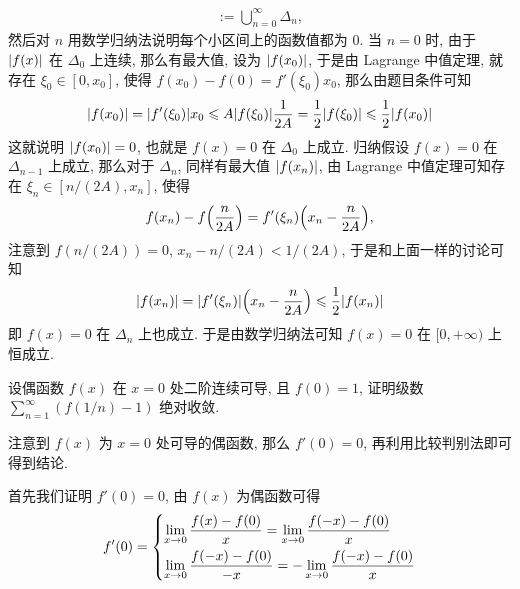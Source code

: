 \begin{exercise}[series=exer]
\begin{answer}
      \begin{align*}
          [0, +\infty) = \bigcup_{n = 0}^{\infty}\qty[\frac{n}{2A}, \frac{n + 1}{2A}] := \bigcup_{n = 0}^{\infty}\Delta_{n},
      \end{align*}
      然后对 $ n $ 用数学归纳法说明每个小区间上的函数值都为 $ 0 $. 当 $ n = 0 $ 时, 由于 $ \abs{f(x)} $ 在 $ \Delta_{0} $ 上连续, 那么有最大值, 设为 $ \abs{f(x_{0})} $, 于是由 Lagrange 中值定理, 就存在 $ \xi_{0} \in [0, x_{0}] $, 使得 $ f(x_{0}) - f(0) = f'(\xi_{0})x_{0} $, 那么由题目条件可知
      \begin{align*}
          \abs{f(x_{0})} = \abs{f'(\xi_{0})}x_{0} \leqslant A\abs{f(\xi_{0})}\frac{1}{2A} = \frac{1}{2}\abs{f(\xi_{0})} \leqslant \frac{1}{2}\abs{f(x_{0})}
      \end{align*}
      这就说明 $ \abs{f(x_{0})} = 0 $, 也就是 $ f(x) = 0 $ 在 $ \Delta_{0} $ 上成立. 归纳假设 $ f(x) = 0 $ 在 $ \Delta_{n - 1} $ 上成立, 那么对于 $ \Delta_{n} $, 同样有最大值 $ \abs{f(x_{n})} $, 由 Lagrange 中值定理可知存在 $ \xi_{n} \in [n/(2A), x_{n}] $, 使得
      \begin{align*}
          f(x_{n}) - f\qty(\frac{n}{2A}) = f'(\xi_{n})\qty(x_{n} - \frac{n}{2A}),
      \end{align*}
      注意到 $ f(n/(2A)) = 0 $, $ x_{n} - n/(2A) < 1/(2A) $, 于是和上面一样的讨论可知
      \begin{align*}
          \abs{f(x_{n})} = \abs{f'(\xi_{n})}\qty(x_{n} - \frac{n}{2A}) \leqslant \frac{1}{2}\abs{f(x_{n})}
      \end{align*}
      即 $ f(x) = 0 $ 在 $ \Delta_{n} $ 上也成立. 于是由数学归纳法可知 $ f(x) = 0 $ 在 $ [0, +\infty) $ 上恒成立.
  \end{answer}
  \item 设偶函数 $ f(x) $ 在 $ x = 0 $ 处二阶连续可导, 且 $ f(0) = 1 $, 证明级数 $ \sum_{n = 1}^{\infty} (f(1/n) - 1) $ 绝对收敛.
  \begin{hint}
      注意到 $ f(x) $ 为 $ x = 0 $ 处可导的偶函数, 那么 $ f'(0) = 0 $, 再利用比较判别法即可得到结论.
  \end{hint}
  \begin{answer}
      首先我们证明 $ f'(0) = 0 $, 由 $ f(x) $ 为偶函数可得
      \begin{align*}
          f'(0) = \begin{dcases}
              \limit{x}{0}\frac{f(x) - f(0)}{x} = \limit{x}{0}\frac{f(-x) - f(0)}{x} \\
              \limit{x}{0} \frac{f(-x) - f(0)}{-x} = -\limit{x}{0}\frac{f(-x) - f(0)}{x}
          \end{dcases}

\end{align*}
\end{answer}
\end{exercise}
